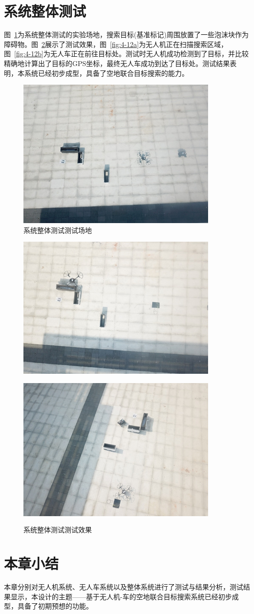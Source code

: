 \section{系统整体测试}
图~\ref{fig:4-11}为系统整体测试的实验场地，搜索目标(基准标记)周围放置了一些泡沫块作为障碍物。图~\ref{fig:4-12}展示了测试效果，图~\ref{fig:4-12a}为无人机正在扫描搜索区域，图~\ref{fig:4-12b}为无人车正在前往目标处。测试时无人机成功检测到了目标，并比较精确地计算出了目标的GPS坐标，最终无人车成功到达了目标处。测试结果表明，本系统已经初步成型，具备了空地联合目标搜索的能力。

\begin{figure}[htb]
	\centering
	\includegraphics[width=0.4\linewidth]{figures/4-11.png}
	\caption{系统整体测试测试场地}
	\label{fig:4-11}
\end{figure}

\begin{figure}[htb]
	\centering
	\begin{minipage}[t]{\linewidth} 
		\centering
		\includegraphics[width=0.5\columnwidth]{figures/4-12a.png} 
		\label{fig:4-12a}
	\end{minipage}
	\begin{minipage}[t]{\linewidth} 
		\centering
		\includegraphics[width=0.5\columnwidth]{figures/4-12b.png} 
		\label{fig:4-12b} 
	\end{minipage}
	\caption{系统整体测试测试效果}
	\label{fig:4-12}
\end{figure}

\section{本章小结}
本章分别对无人机系统、无人车系统以及整体系统进行了测试与结果分析，测试结果显示，本设计的主题——基于无人机-车的空地联合目标搜索系统已经初步成型，具备了初期预想的功能。
